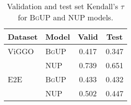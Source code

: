 \begin{table}[t!]
\centering

\begin{tabular}{ll c c}
\toprule
Dataset & Model & Valid & Test \\
\midrule
ViGGO & \textsc{BgUP} & 0.417 & 0.347 \\
                       & \textsc{NUP} & 0.739 & 0.651 \\
\midrule
E2E & \textsc{BgUP} & 0.433 & 0.432 \\
                       & \textsc{NUP} & 0.502 & 0.447 \\
\bottomrule
\end{tabular}


\caption{Validation and test set Kendall's $\tau$ for \textsc{BgUP} and 
NUP models.}
\label{app:ndp_tau}
\end{table}
